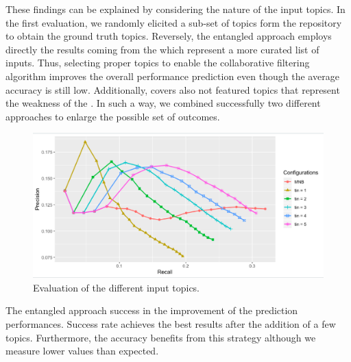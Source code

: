 These findings can be explained by considering the nature of the input topics. In the first \CT evaluation, we randomly elicited a sub-set of topics form the repository to obtain the ground truth topics. Reversely, the entangled approach employs directly the results coming from the \MNB which represent a more curated list of inputs. Thus, selecting proper topics to enable the collaborative filtering algorithm improves the overall performance prediction even though the average accuracy is still low. Additionally, \CT covers also not featured topics that represent the weakness of the \MNB. In such a way, we combined successfully two different approaches to enlarge the possible set of outcomes. 

\begin{figure}[t!]
	\centering
	\includegraphics[width=\linewidth]{figs/PRCs_entangled}
	\caption{Evaluation of the different input topics.}
	\label{fig:prcs-entangled}
\end{figure} 


\begin{tcolorbox}[boxrule=0.86pt,left=0.3em, right=0.3em,top=0.1em, bottom=0.05em]
The entangled approach success in the improvement of the prediction performances. Success rate achieves the best results after the addition of a few topics. Furthermore, the accuracy benefits from this strategy although we measure lower values than expected.
\end{tcolorbox}









